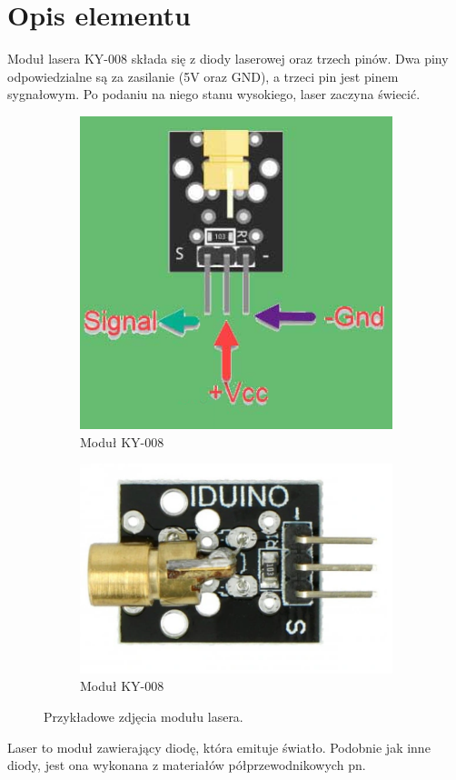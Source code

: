 \documentclass[11pt, a4paper]{article}
\author{Adam Rewekant}
\institute{Instytut Robotyki i Inteligencji Maszynowej}
\begin{document}

\newpage
\section*{Opis elementu} 
Moduł lasera KY-008 składa się z diody laserowej oraz trzech pinów. Dwa piny odpowiedzialne są za zasilanie (5V oraz GND), a trzeci pin jest pinem sygnałowym. Po podaniu na niego stanu wysokiego, laser zaczyna świecić.

\vspace{0.5cm}
\begin{figure}[h]
\centering
\begin{subfigure}{.5\textwidth}
  \centering
  \includegraphics[width=.4\linewidth]{fig/laser/zdjecie1.png}
  \caption{Moduł KY-008 \cite{zdjecia}}
  \label{fig:sub1}
\end{subfigure}%
\begin{subfigure}{.5\textwidth}
  \centering
  \includegraphics[width=.6\linewidth]{fig/laser/zdjecie2.png}
  \caption{Moduł KY-008 \cite{budowa}}
  \label{fig:sub2}
\end{subfigure}
\caption{Przykładowe zdjęcia modułu lasera.}
\label{fig:test}
\end{figure}
\vspace{0.5cm}

Laser to moduł zawierający diodę, która emituje światło. Podobnie jak inne diody, jest ona wykonana z materiałów półprzewodnikowych pn.
\end{document}

